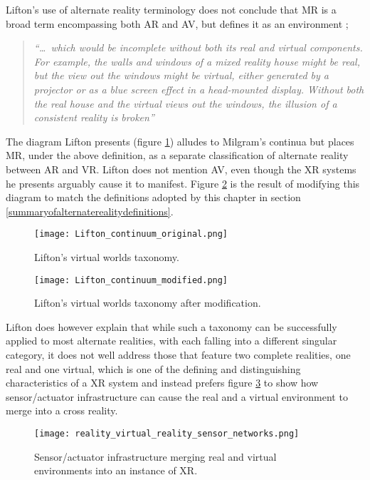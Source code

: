 Lifton's use of alternate reality terminology does not conclude that MR is a broad term encompassing both AR and AV, but defines it as an environment ;

\begin{quote}
	\textit{``\ldots\ which would be incomplete without both its real and virtual components. For example, the walls and windows of a mixed reality house might be real, but the view out the windows might be virtual, either generated by a projector or as a blue screen effect in a head-mounted display. Without both the real house and the virtual views out the windows, the illusion of a consistent reality is broken''}~\cite{Lifton2007a}
\end{quote}

The diagram Lifton presents (figure \ref{original_lifton_axis.png}) alludes to Milgram's continua but places MR, under the above definition, as a separate classification of alternate reality between AR and VR. Lifton does not mention AV, even though the XR systems he presents arguably cause it to manifest. Figure \ref{modified_lifton_axis.png} is the result of modifying this diagram to match the definitions adopted by this chapter in section \ref{summaryofalternaterealitydefinitions}.

\begin{figure}[h]
	\centering
	\texttt{[image: Lifton\_continuum\_original.png]}
	\caption{Lifton's virtual worlds taxonomy.}
	\label{original_lifton_axis.png}
\end{figure}

\begin{figure}[h]
	\centering
	\texttt{[image: Lifton\_continuum\_modified.png]}
	\caption{Lifton's virtual worlds taxonomy after modification.}
	\label{modified_lifton_axis.png}
\end{figure}

Lifton does however explain that while such a taxonomy can be successfully applied to most alternate realities, with each falling into a different singular category, it does not well address those that feature two complete realities, one real and one virtual, which is one of the defining and distinguishing characteristics of a XR system and instead prefers figure \ref{reality_virtual_reality_sensor_networks.png} to show how sensor/actuator infrastructure can cause the real and a virtual environment to merge into a cross reality.

\begin{figure}[h]
	\centering
	\texttt{[image: reality\_virtual\_reality\_sensor\_networks.png]}
	\caption{Sensor/actuator infrastructure merging real and virtual environments into an instance of XR.}
	\label{reality_virtual_reality_sensor_networks.png}
\end{figure}

